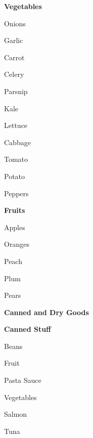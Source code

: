 \documentclass[12pt]{article}
\newcommand{\SmallSep}{\vspace{0.5em}}
\newcommand{\StoreSection}[1]
	{\Large\textbf{\color{Purple} #1}\par
	\SmallSep\normalsize}
\newcommand{\StoreItem}[1]
	{\textbf{\color{RoyalBlue} #1}}
\begin{document}
\StoreItem{Vegetables}
\begin{multicols}{4}
\begin{compactitem}[\color{RoyalBlue}$\Box$]
	\item Onions
	\item Garlic
	\item Carrot
	\item Celery 
    \item Parsnip
    \item Kale
    \item Lettuce
    \item Cabbage
    \item Tomato
    \item Potato
    \item Peppers
	\item \underline{\hspace{3cm}}
	\item \underline{\hspace{3cm}}
\end{compactitem}
\end{multicols}


\StoreItem{Fruits}
\begin{multicols}{4}
\begin{compactitem}[\color{RoyalBlue}$\Box$]
	\item Apples
	\item Oranges
	\item Peach
	\item Plum
    \item Pears
	\item \underline{\hspace{3cm}}
	\item \underline{\hspace{3cm}}
\end{compactitem}
\end{multicols}

\StoreSection{Canned and Dry Goods}

\StoreItem{Canned Stuff}
\begin{multicols}{4}
\begin{compactitem}[\color{RoyalBlue}$\Box$]
	\item Beans
	\item Fruit
	\item Pasta Sauce
	\item Vegetables
    \item Salmon
    \item Tuna
	\item \underline{\hspace{3cm}}
	\item \underline{\hspace{3cm}}
\end{compactitem}
\end{multicols}
\end{document}
